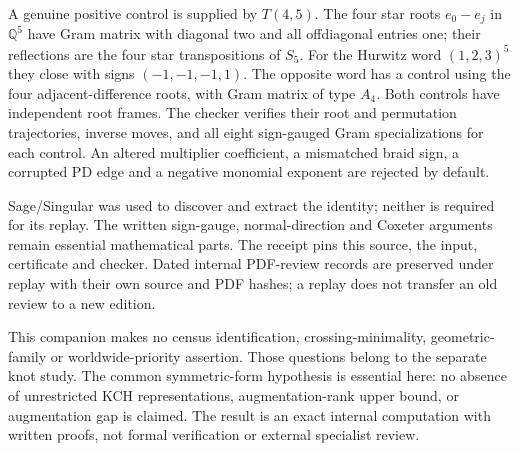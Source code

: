 \documentclass[11pt]{article}
\begin{document}
A genuine positive control is supplied by $T(4,5)$.
The four star roots $e_0-e_j$ in $\mathbb Q^5$ have Gram matrix with
diagonal two and all offdiagonal entries one; their reflections
are the four star transpositions of $S_5$.
For the Hurwitz word $(1,2,3)^5$ they close with signs $(-1,-1,-1,1)$.
The opposite word has a control using the four adjacent-difference
roots, with Gram matrix of type $A_4$.
Both controls have independent root frames. The checker verifies
their root and permutation trajectories, inverse moves, and all
eight sign-gauged Gram specializations for each control.
An altered multiplier coefficient, a mismatched braid sign,
a corrupted PD edge and a negative monomial exponent are rejected
by default.

Sage/Singular was used to discover and extract the identity;
neither is required for its replay. The written sign-gauge,
normal-direction and Coxeter arguments remain essential mathematical
parts. The receipt pins this source, the input, certificate and
checker. Dated internal PDF-review records are preserved under replay
with their own source and PDF hashes; a replay does not transfer an
old review to a new edition.

This companion makes no census identification, crossing-minimality,
geometric-family or worldwide-priority assertion. Those questions
belong to the separate knot study. The common symmetric-form
hypothesis is essential here: no absence of unrestricted KCH
representations, augmentation-rank upper bound, or augmentation gap
is claimed. The result is an exact internal computation with written
proofs, not formal verification or external specialist review.
\end{document}
